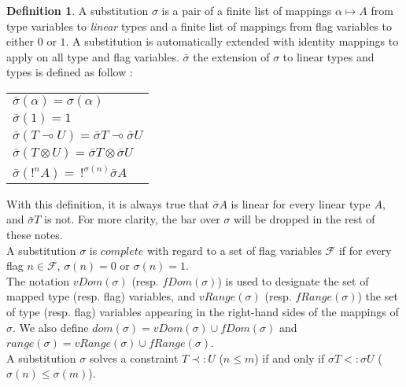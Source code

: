 \documentclass[10pt]{article}
\theoremstyle{plain}
\theoremstyle{definition}
\newtheorem{defn}{Definition}[subsection] %
\begin{document}
\begin{defn} A substitution $\sigma$ is a pair of a finite list of mappings $\alpha \mapsto A$ from type variables to
	\textit{linear} types 	and a finite list of mappings from flag variables to either $0$ or $1$.
	A substitution is automatically extended with identity mappings to apply on all type and flag variables.
	$\bar{\sigma}$ the extension of $\sigma$ to linear types and types is defined as follow :
 		\begin{center}
 		\begin{tabular}{l}
 			$\bar{\sigma}(\alpha) = \sigma(\alpha)$ \\
			$\bar{\sigma}(1) = 1$ \\
 			$\bar{\sigma}(T \multimap U) = \bar{\sigma}T \multimap \bar{\sigma}U$ \\
 			$\bar{\sigma}(T \otimes U) = \bar{\sigma}T \otimes \bar{\sigma}U$ \\
 			$\bar{\sigma}(!^n A) = ~ !^{\sigma(n)} \bar{\sigma}A$
 		\end{tabular}
 		\end{center}
 	With this definition, it is always true that $\bar\sigma A$ is linear for every linear type $A$, and $\bar\sigma T$ is not.
 	For more clarity, the bar over $\sigma$ will be dropped in the rest of these notes. \\
 	A substitution $\sigma$ is $\textit{complete}$ with regard to a set of flag variables $\mathcal{F}$ if for every flag $n \in \mathcal{F}$,
 	$\sigma (n) = 0$ or $\sigma (n) = 1$. \\
 	The notation $vDom(\sigma)$ (resp. $fDom(\sigma)$) is used to designate the set of mapped type (resp. flag) variables, and
 	$vRange(\sigma)$ (resp. $fRange(\sigma)$) the set of type (resp. flag) variables appearing in the right-hand sides of the mappings
 	of $\sigma$. We also define $dom(\sigma) = vDom(\sigma) \cup fDom(\sigma)$ and $range(\sigma) = vRange(\sigma) \cup fRange (\sigma)$. \\
 	A substitution $\sigma$ solves a constraint $T \prec: U$ ($n \le m$) if and only if $\sigma T <: \sigma U$ ($\sigma(n) \le \sigma(m)$).
\end{defn}
\end{document}
